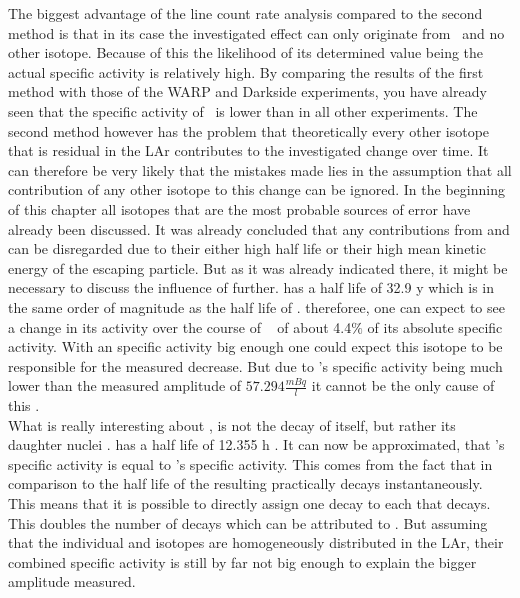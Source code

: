 \documentclass[encoding=utf8,british]{tumphthesis}
\begin{document}
The biggest advantage of the line count rate analysis compared to the second method is that in its case the investigated effect can only originate from \Kr\ and no other isotope.
Because of this the likelihood of its determined value being the actual specific activity is relatively high.
By comparing the results of the first method with those of the WARP and Darkside experiments, you have already seen that the specific activity of \Kr\ is lower than in all other experiments.
The second method however has the problem that theoretically every other isotope that is residual in the LAr contributes to the investigated change over time.
It can therefore be very likely that the mistakes made lies in the assumption that all contribution of any other isotope to this change can be ignored. 
In the beginning of this chapter all isotopes that are the most probable sources of error have already been discussed.
It was already concluded that any contributions from  and  can be disregarded due to their either high half life or their high mean kinetic energy of the escaping particle.
But as it was already indicated there, it might be necessary to discuss the influence of  further.
 has a half life of 32.9 y which is in the same order of magnitude as the half life of \Kr.
thereforee, one can expect to see a change in its activity over the course of \PII~ of about 4.4$\%$ of its absolute specific activity.
With an specific activity big enough one could expect this isotope to be responsible for the measured decrease.
But due to 's specific activity being much lower than the measured amplitude of $57.294 \frac{\unit{mBq}}{\unit{l}}$  it cannot be the only cause of this .
\\

What is really interesting about , is not the decay of  itself, but rather its daughter nuclei .
 has a half life of 12.355 h \cite{chen_nuclear_2016}.
It can now be approximated, that 's specific activity is equal to 's specific activity.
This comes from the fact that in comparison to the half life of  the resulting  practically decays instantaneously.
This means that it is possible to directly assign one  decay to each  that decays.
This doubles the number of decays which can be attributed to .
But assuming that the individual  and  isotopes are homogeneously distributed in the LAr, their combined specific activity is still by far not big enough to explain the bigger amplitude measured.
\\
\end{document}
